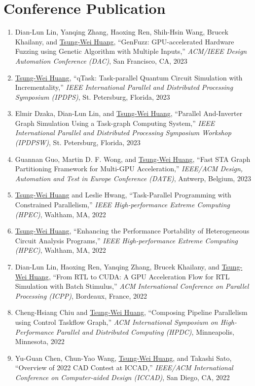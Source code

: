 \documentclass[A4,11pt]{article}
\begin{document}
\section{Conference Publication}
 \begin{enumerate}
 \itemsep-3pt
    \item Dian-Lun Lin, Yanqing Zhang, Haoxing Ren, Shih-Hsin Wang, Brucek Khailany, and \underline{Tsung-Wei Huang}, ``GenFuzz: GPU-accelerated Hardware Fuzzing using Genetic Algorithm with Multiple Inputs,'' \textit{ACM/IEEE Design Automation Conference (DAC)}, San Francisco, CA, 2023
    \item \underline{Tsung-Wei Huang}, ``qTask: Task-parallel Quantum Circuit Simulation with Incrementality,'' \textit{IEEE International Parallel and Distributed Processing Symposium (IPDPS)}, St. Petersburg, Florida, 2023 
    \item Elmir Dzaka, Dian-Lun Lin, and \underline{Tsung-Wei Huang}, ``Parallel And-Inverter Graph Simulation Using a Task-graph Computing System,'' \textit{IEEE International Parallel and Distributed Processing Symposium Workshop (IPDPSW)}, St. Petersburg, Florida, 2023 
    \item Guannan Guo, Martin D. F. Wong, and \underline{Tsung-Wei Huang}, ``Fast STA Graph Partitioning Framework for Multi-GPU Acceleration,'' \textit{IEEE/ACM Design, Automation and Test in Europe Conference (DATE)}, Antwerp, Belgium, 2023
    \item \underline{Tsung-Wei Huang} and Leslie Hwang, ``Task-Parallel Programming with Constrained Parallelism,'' \textit{IEEE High-performance Extreme Computing (HPEC)}, Waltham, MA, 2022
    \item \underline{Tsung-Wei Huang}, ``Enhancing the Performance Portability of Heterogeneous Circuit Analysis Programs,'' \textit{IEEE High-performance Extreme Computing (HPEC)}, Waltham, MA, 2022
    \item Dian-Lun Lin, Haoxing Ren, Yanqing Zhang, Brucek Khailany, and \underline{Tsung-Wei Huang}, ``From RTL to CUDA: A GPU Acceleration Flow for RTL Simulation with Batch Stimulus,'' \textit{ACM International Conference on Parallel Processing (ICPP)}, Bordeaux, France, 2022
    \item Cheng-Hsiang Chiu and \underline{Tsung-Wei Huang}, ``Composing Pipeline Parallelism using Control Taskflow Graph,'' \textit{ACM International Symposium on High-Performance Parallel and Distributed Computing (HPDC)}, Minneapolis, Minnesota, 2022
    \item Yu-Guan Chen, Chun-Yao Wang, \underline{Tsung-Wei Huang}, and Takashi Sato, ``Overview of 2022 CAD Contest at ICCAD,'' \textit{IEEE/ACM International Conference on Computer-aided Design (ICCAD)}, San Diego, CA, 2022

\end{enumerate}
\end{document}
